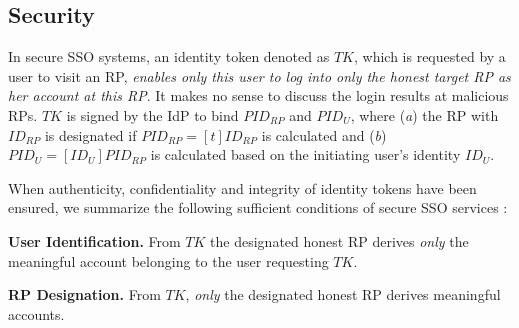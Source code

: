 

\subsection{Security}
\label{analysis-security}

In secure SSO systems, an identity token denoted as $TK$, which is requested by a user to visit an RP,
    \emph{enables only this user to log into only the honest target RP as her account at this RP}. It makes no sense to discuss the login results at malicious RPs.
$TK$ is signed by the IdP to bind $PID_{RP}$ and $PID_U$,
where (\emph{a}) the RP with $ID_{RP}$ is designated if $PID_{RP} = [t]ID_{RP}$ is calculated
    and (\emph{b}) $PID_U = [ID_U]PID_{RP}$ is calculated based on the initiating user's identity $ID_U$.

When authenticity, confidentiality and integrity of identity tokens have been ensured, we summarize the following sufficient conditions of secure SSO services \cite{FettKS14,BrowserID,SPRESSO}:

\noindent \textbf{User Identification.} %
From $TK$ the designated honest RP derives \emph{only} the meaningful account belonging to the user requesting $TK$.

\noindent \textbf{RP Designation.} From $TK$, \emph{only} the designated honest RP derives meaningful accounts.

